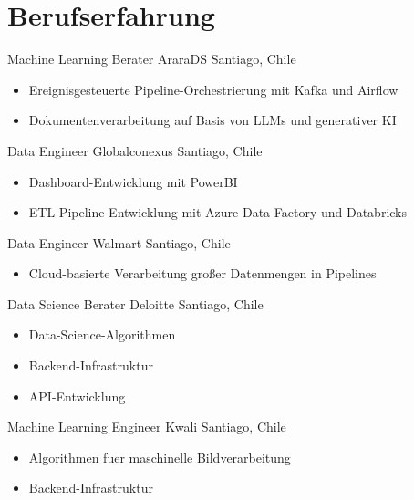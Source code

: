 \section{Berufserfahrung}

        {Machine Learning Berater}
        {AraraDS}
        {Santiago, Chile}
        {}
        {
        \begin{itemize}
            \item Ereignisgesteuerte Pipeline-Orchestrierung mit Kafka und Airflow
            \item Dokumentenverarbeitung auf Basis von LLMs und generativer KI
        \end{itemize}
        }

\vspace{6pt}

        {Data Engineer}
        {Globalconexus}
        {Santiago, Chile}
        {}
        {
        \begin{itemize}
            \item Dashboard-Entwicklung mit PowerBI
            \item ETL-Pipeline-Entwicklung mit Azure Data Factory und Databricks
        \end{itemize}
        }

\vspace{6pt}

        {Data Engineer}
        {Walmart}
        {Santiago, Chile}
        {}
        {
        \begin{itemize}
            \item Cloud-basierte Verarbeitung großer Datenmengen in Pipelines
        \end{itemize}
        }

        {Data Science Berater}
        {Deloitte}
        {Santiago, Chile}
        {}
        {
        \begin{itemize}
            \item Data-Science-Algorithmen
            \item Backend-Infrastruktur
            \item API-Entwicklung
        \end{itemize}
        }

        {Machine Learning Engineer}
        {Kwali}
        {Santiago, Chile}
        {}
        {
        \begin{itemize}
            \item Algorithmen fuer maschinelle Bildverarbeitung
            \item Backend-Infrastruktur
        \end{itemize}
        }

